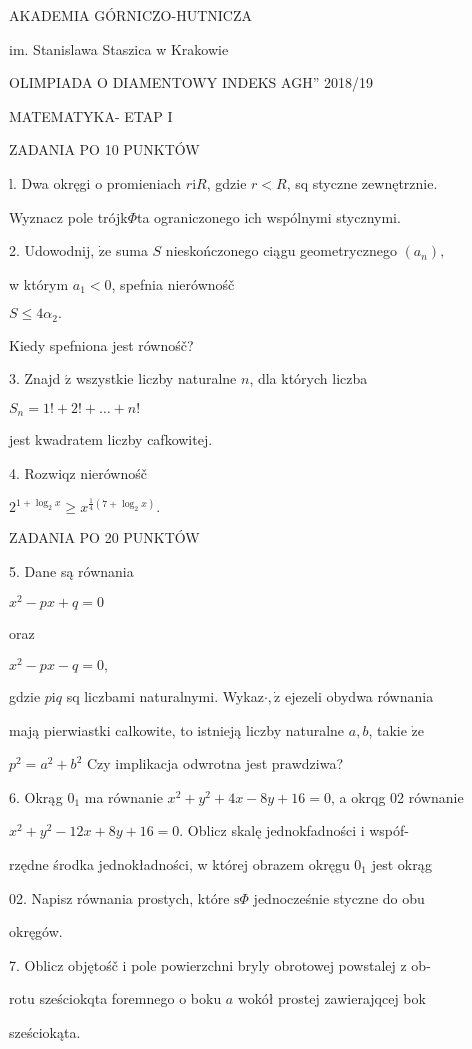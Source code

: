 \documentclass[a4paper,12pt]{article}
\begin{document}
AKADEMIA GÓRNICZO-HUTNICZA

im. Stanislawa Staszica w Krakowie

OLIMPIADA O DIAMENTOWY INDEKS AGH'' 2018/19

MATEMATYKA- ETAP I

ZADANIA PO 10 PUNKTÓW

l. Dwa okręgi o promieniach $r\mathrm{i}R$, gdzie $r<R$, sq styczne zewnętrznie.

Wyznacz pole trójk$\Phi$ta ograniczonego ich wspólnymi stycznymi.

2. Udowodnij, $\dot{\mathrm{z}}\mathrm{e}$ suma $S$ nieskończonego ciągu geometrycznego $(a_{n}),$

w którym $a_{1}<0$, spefnia nierównośč

$S\leq 4\alpha_{2}.$

Kiedy spefniona jest równośč?

3. Znajd $\acute{\mathrm{z}}$ wszystkie liczby naturalne $n$, dla których liczba

$S_{n}=1!+2!+\ldots+n!$

jest kwadratem liczby cafkowitej.

4. Rozwiqz nierównośč

$2^{1+\log_{2}x}\geq x^{\frac{1}{4}(7+\log_{2}x)}.$

ZADANIA PO 20 PUNKTÓW

5. Dane są równania

$x^{2}-px+q=0$

oraz

$x^{2}-px-q=0,$

gdzie $p\mathrm{i}q$ sq liczbami naturalnymi. Wykaz$\cdot, \dot{\mathrm{z}}$ ejezeli obydwa równania

mają pierwiastki calkowite, to istnieją liczby naturalne $a, b$, takie $\dot{\mathrm{z}}\mathrm{e}$

$p^{2}=a^{2}+b^{2}$ Czy implikacja odwrotna jest prawdziwa?

6. Okrąg $0_{1}$ ma równanie $x^{2}+y^{2}+4x-8y+16=0$, a okrqg 02 równanie

$x^{2}+y^{2}-12x+8y+16 = 0$. Oblicz skalę jednokfadności i wspóf-

rzędne środka jednokładności, w której obrazem okręgu $0_{1}$ jest okrąg

02. Napisz równania prostych, które $\mathrm{s}\Phi$ jednocześnie styczne do obu

okręgów.

7. Oblicz objętośč i pole powierzchni bryly obrotowej powstalej z ob-

rotu sześciokqta foremnego o boku $a$ wokół prostej zawierajqcej bok

sześciokąta.
\end{document}

